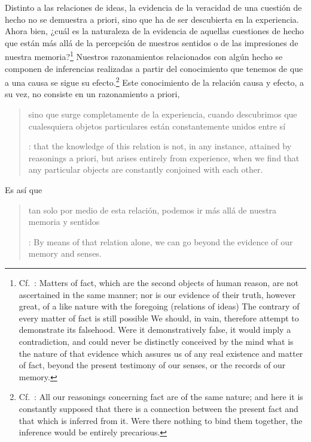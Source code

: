 Distinto a las relaciones de ideas, la evidencia de la veracidad de una cuestión de hecho no se demuestra a priori, sino que ha de ser descubierta en la experiencia. Ahora bien, ¿cuál es la naturaleza de la evidencia de aquellas cuestiones de hecho que están más allá de la percepción de nuestros sentidos o de las impresiones de nuestra memoria?\footnote{Cf.~\cite[\S4,1. 15]{hume1777enquiry}: Matters of fact, which are the second objects of human reason, are not ascertained in the same manner; nor is our evidence of their truth, however great, of a like nature with the foregoing (relations of ideas) \textelp{} The contrary of every matter of fact is still possible \textelp{} We should, in vain, therefore attempt to demonstrate its falsehood. Were it demonstratively false, it would imply a contradiction, and could never be distinctly conceived by the mind \textelp{} what is the nature of that evidence which assures us of any real existence and matter of fact, beyond the present testimony of our senses, or the records of our memory.} Nuestros razonamientos relacionados con algún hecho se componen de inferencias realizadas a partir del conocimiento que tenemos de que a una causa se sigue su efecto.\footnote{Cf.~\cite[\S4,1. 16]{hume1777enquiry}: All our reasonings concerning fact are of the same nature; and here it is constantly supposed that there is a connection between the present fact and that which is inferred from it. Were there nothing to bind them together, the inference would be entirely precarious.} Este conocimiento de la relación causa y efecto, a su vez, no consiste en un razonamiento a priori, \blockquote[{\cite[\S4,1. 17]{hume1777enquiry}}: that the knowledge of this relation is not, in any instance, attained by reasonings a priori, but arises entirely from experience, when we find that any particular objects are constantly conjoined with each other.]{sino que surge completamente de la experiencia, cuando descubrimos que cualesquiera objetos particulares están constantemente unidos entre sí}. Es así que \blockquote[{\cite[\S4,1. 16]{hume1777enquiry}}: By means of that relation alone, we can go beyond the evidence of our memory and senses.]{tan solo por medio de esta relación, podemos ir más allá de nuestra memoria y sentidos}.

